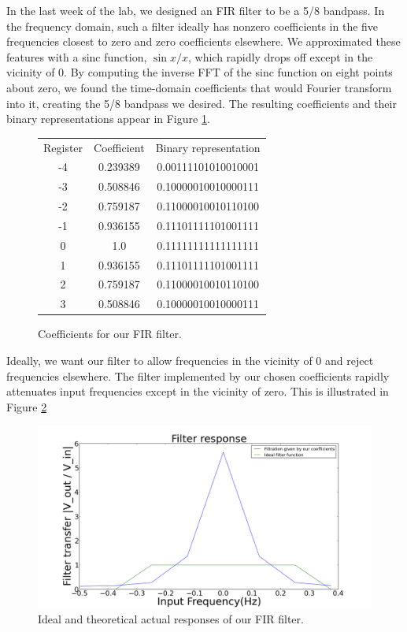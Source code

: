 \documentclass[11pt]{article}
\begin{document}
In the last week of the lab, we designed an FIR filter to be a 5/8 bandpass. In the frequency domain, such a filter ideally has nonzero coefficients in the five frequencies closest to zero and zero coefficients elsewhere. We approximated these features with a sinc function, $\sin{x}/x$, which rapidly drops off except in the vicinity of 0. By computing the inverse FFT of the sinc function on eight points about zero, we found the time-domain coefficients that would Fourier transform into it, creating the 5/8 bandpass we desired. The resulting coefficients and their binary representations appear in Figure \ref{table}.
\begin{figure}
\centering
\begin{tabular}{c|c|c}
Register & Coefficient & Binary representation \\
-4 & 0.239389 & 0.00111101010010001 \\
-3 & 0.508846 & 0.10000010010000111\\
-2 & 0.759187 & 0.11000010010110100\\
-1 & 0.936155 & 0.11101111101001111\\
0 & 1.0 & 0.11111111111111111\\
1 & 0.936155 & 0.11101111101001111\\
2 & 0.759187 & 0.11000010010110100\\
3 & 0.508846 & 0.10000010010000111\\
\end{tabular}
\caption{Coefficients for our FIR filter. \label{table}}
\end{figure}

Ideally, we want our filter to allow frequencies in the vicinity of 0 and reject frequencies elsewhere. The filter implemented by our chosen coefficients rapidly attenuates input frequencies except in the vicinity of zero. This is illustrated in Figure \ref{firtheory}

\begin{figure}
\centering
\includegraphics[scale=0.35]{pictures/firtheory}
\caption{Ideal and theoretical actual responses of our FIR filter. \label{firtheory}}
\end{figure}
\end{document}
